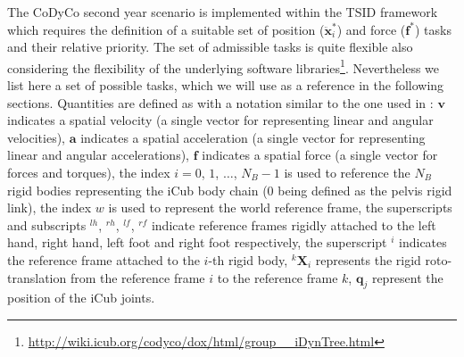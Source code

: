 \documentclass[12pt,a4paper,twoside]{article}
\begin{document}
The CoDyCo second year scenario is implemented within the TSID framework which requires the definition of a suitable set of position ($\ddot {\bm x}_i^*$) and force ($\bm f^*$) tasks and their relative priority. The set of admissible tasks is quite flexible also considering the flexibility of the underlying software libraries\footnote{\url{http://wiki.icub.org/codyco/dox/html/group__iDynTree.html}}. Nevertheless we list here a set of possible tasks, which we will use as a reference in the following sections. Quantities are defined as with a notation similar to the one used in \cite{featherstone2008}: $\bm v$  indicates a spatial velocity (a single vector for representing linear and angular velocities), $\bm a$  indicates a spatial acceleration (a single vector for representing linear and angular accelerations), $\bm f$ indicates a spatial force (a single vector for forces and torques), the index $i  =0$, $1$, $\dots$, $N_B-1$ is used to reference the $N_B$ rigid bodies representing the iCub body chain ($0$ being defined as the pelvis rigid link), the index $w$ is used to represent the world reference frame, the superscripts and subscripts $^{lh}$, $^{rh}$, $^{lf}$, $^{rf}$ indicate reference frames rigidly attached to the left hand, right hand, left foot and right foot respectively, the superscript $^{i}$ indicates the reference frame attached to the $i$-th rigid body, $^k {\bm X}_i$ represents the rigid roto-translation from the reference frame $i$ to the reference frame $k$, $\bm q_j$ represent the position of the iCub joints.
\end{document}
